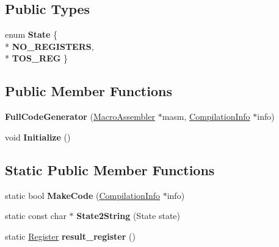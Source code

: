 \subsection*{Public Types}
\begin{DoxyCompactItemize}
\item 
enum {\bfseries State} \{ \\*
{\bfseries N\+O\+\_\+\+R\+E\+G\+I\+S\+T\+E\+RS}, 
\\*
{\bfseries T\+O\+S\+\_\+\+R\+EG}
 \}\hypertarget{classv8_1_1internal_1_1_full_code_generator_abccd621180f301a694c266a6e724d9d9}{}\label{classv8_1_1internal_1_1_full_code_generator_abccd621180f301a694c266a6e724d9d9}

\end{DoxyCompactItemize}
\subsection*{Public Member Functions}
\begin{DoxyCompactItemize}
\item 
{\bfseries Full\+Code\+Generator} (\hyperlink{classv8_1_1internal_1_1_macro_assembler}{Macro\+Assembler} $\ast$masm, \hyperlink{classv8_1_1internal_1_1_compilation_info}{Compilation\+Info} $\ast$info)\hypertarget{classv8_1_1internal_1_1_full_code_generator_aca7a23314040488a80ea5ffdb95bdb1e}{}\label{classv8_1_1internal_1_1_full_code_generator_aca7a23314040488a80ea5ffdb95bdb1e}

\item 
void {\bfseries Initialize} ()\hypertarget{classv8_1_1internal_1_1_full_code_generator_ad877afd6ba30a8379c8f0ad49865d0c3}{}\label{classv8_1_1internal_1_1_full_code_generator_ad877afd6ba30a8379c8f0ad49865d0c3}

\end{DoxyCompactItemize}
\subsection*{Static Public Member Functions}
\begin{DoxyCompactItemize}
\item 
static bool {\bfseries Make\+Code} (\hyperlink{classv8_1_1internal_1_1_compilation_info}{Compilation\+Info} $\ast$info)\hypertarget{classv8_1_1internal_1_1_full_code_generator_a37671dc542ebcb8c8f182ca4c697efda}{}\label{classv8_1_1internal_1_1_full_code_generator_a37671dc542ebcb8c8f182ca4c697efda}

\item 
static const char $\ast$ {\bfseries State2\+String} (State state)\hypertarget{classv8_1_1internal_1_1_full_code_generator_aa4207f08ba12f962f015b5cd82fc0993}{}\label{classv8_1_1internal_1_1_full_code_generator_aa4207f08ba12f962f015b5cd82fc0993}

\item 
static \hyperlink{structv8_1_1internal_1_1_register}{Register} {\bfseries result\+\_\+register} ()\hypertarget{classv8_1_1internal_1_1_full_code_generator_ae2d1f5852e0595ad9c7988977f7ef697}{}\label{classv8_1_1internal_1_1_full_code_generator_ae2d1f5852e0595ad9c7988977f7ef697}

\end{DoxyCompactItemize}
